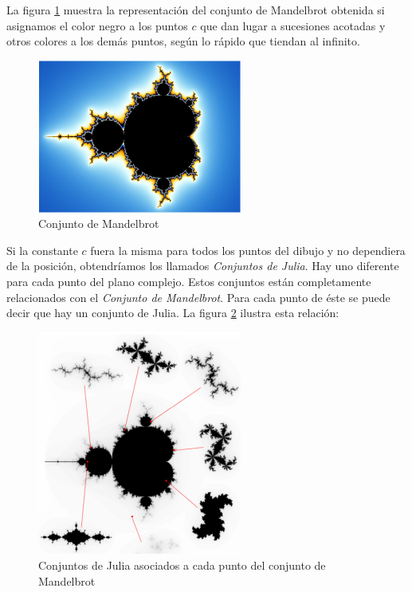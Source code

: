 La figura \ref{fig:Mandelbrot} muestra la representación del conjunto de Mandelbrot obtenida si asignamos el color negro a los puntos $c$ que dan lugar a sucesiones acotadas y otros colores a los demás puntos, según lo rápido que tiendan al infinito.

\begin{figure}[hbtp]
\centering
\includegraphics[width = 0.6\textwidth]{img/Mandelbrot_set.png}
\caption{Conjunto de Mandelbrot}
\label{fig:Mandelbrot}
\end{figure}

Si la constante $c$ fuera la misma para todos los puntos del dibujo y no dependiera de la posición, obtendríamos los llamados \emph{Conjuntos de Julia}. Hay uno diferente para cada punto del plano complejo. Estos conjuntos están completamente relacionados con el \emph{Conjunto de Mandelbrot}. Para cada punto de éste se puede decir que hay un conjunto de Julia. La figura \ref{fig:Mandelbrot-Julia} ilustra esta relación:

\begin{figure}[hbtp]
\centering
\includegraphics[width = 0.6\textwidth]{img/Mandelbrot-Julia.png}
\caption{Conjuntos de Julia asociados a cada punto del conjunto de Mandelbrot}
\label{fig:Mandelbrot-Julia}
\end{figure}

